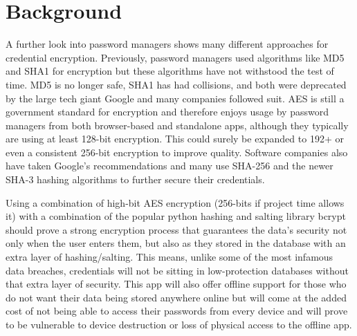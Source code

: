 \documentclass{article}
\numberwithin{equation}{section} %
\numberwithin{figure}{section} %
\numberwithin{table}{section} %
\begin{document}
\section{Background}
A further look into password managers shows many different approaches for credential encryption. Previously, password managers used algorithms like MD5 and SHA1 for encryption but these algorithms have not withstood the test of time. MD5 is no longer safe, SHA1 has had collisions, and both were deprecated by the large tech giant Google and many companies followed suit. AES is still a government standard for encryption and therefore enjoys usage by password managers from both browser-based and standalone apps, although they typically are using at least 128-bit encryption. This could surely be expanded to 192+ or even a consistent 256-bit encryption to improve quality. Software companies also have taken Google's recommendations and many use SHA-256 and the newer SHA-3 hashing algorithms to further secure their credentials.

Using a combination of high-bit AES encryption (256-bits if project time allows it) with a combination of the popular python hashing and salting library bcrypt should prove a strong encryption process that guarantees the data's security not only when the user enters them, but also as they stored in the database with an extra layer of hashing/salting. This means, unlike some of the most infamous data breaches, credentials will not be sitting in low-protection databases without that extra layer of security. This app will also offer offline support for those who do not want their data being stored anywhere online but will come at the added cost of not being able to access their passwords from every device and will prove to be vulnerable to device destruction or loss of physical access to the offline app.
\end{document}
